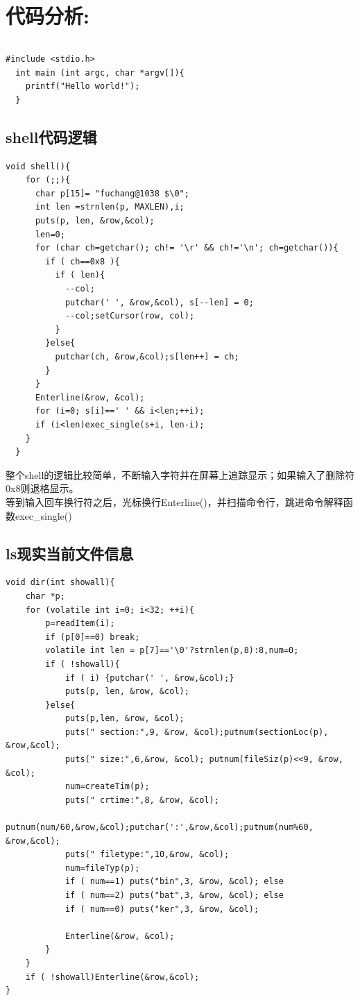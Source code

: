 \documentclass[a4paper,11pt,UTF8]{ctexart}
\begin{document}
\section{代码分析:}
	\begin{lstlisting}[caption={asm code },tabsize=4,basicstyle=\footnotesize,captionpos=b]
  \end{lstlisting}
  
\begin{lstlisting}[caption={一段C代码},captionpos=b]
  #include <stdio.h>
  int main (int argc, char *argv[]){
    printf("Hello world!");
  }
\end{lstlisting}
      \subsection{shell代码逻辑}
      \begin{lstlisting}[caption={一段C代码},captionpos=b]
void shell(){
    for (;;){
      char p[15]= "fuchang@1038 $\0";
      int len =strnlen(p, MAXLEN),i;
      puts(p, len, &row,&col);
      len=0;
      for (char ch=getchar(); ch!= '\r' && ch!='\n'; ch=getchar()){
        if ( ch==0x8 ){
          if ( len){
            --col;
            putchar(' ', &row,&col), s[--len] = 0;
            --col;setCursor(row, col);
          }
        }else{
          putchar(ch, &row,&col);s[len++] = ch;
        }
      }
      Enterline(&row, &col);
      for (i=0; s[i]==' ' && i<len;++i);
      if (i<len)exec_single(s+i, len-i);
    }
  }
      \end{lstlisting}
      整个shell的逻辑比较简单，不断输入字符并在屏幕上追踪显示；如果输入了删除符0x8则退格显示。\\
      等到输入回车换行符之后，光标换行Enterline()，并扫描命令行，跳进命令解释函数exec\_single()

      \subsection{ls现实当前文件信息}
      \begin{lstlisting}[caption={一段C代码},captionpos=b]
void dir(int showall){
	char *p;
	for (volatile int i=0; i<32; ++i){
		p=readItem(i);
		if (p[0]==0) break;
		volatile int len = p[7]=='\0'?strnlen(p,8):8,num=0;
		if ( !showall){
			if ( i) {putchar(' ', &row,&col);}
			puts(p, len, &row, &col);
		}else{
			puts(p,len, &row, &col);
			puts(" section:",9, &row, &col);putnum(sectionLoc(p), &row,&col);
			puts(" size:",6,&row, &col); putnum(fileSiz(p)<<9, &row, &col);
			num=createTim(p);
			puts(" crtime:",8, &row, &col);
			putnum(num/60,&row,&col);putchar(':',&row,&col);putnum(num%60, &row,&col);
			puts(" filetype:",10,&row, &col);
			num=fileTyp(p);
			if ( num==1) puts("bin",3, &row, &col);	else
			if ( num==2) puts("bat",3, &row, &col);	else
			if ( num==0) puts("ker",3, &row, &col);
			
			Enterline(&row, &col);
		}
	}
	if ( !showall)Enterline(&row,&col);
}
      \end{lstlisting}
      
\end{document}
